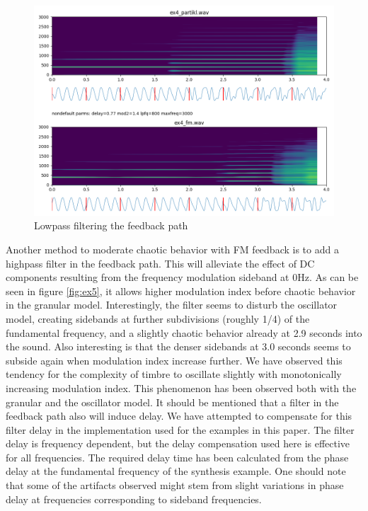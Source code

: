 \documentclass[runningheads,a4paper]{llncs}
\begin{document}
\begin{figure}
	\centering
	\includegraphics[width=.95\textwidth]{ex4_compare.png}
	\caption{Lowpass filtering the feedback path}
	\label{fig:ex4}
\end{figure}

Another method to moderate chaotic behavior with FM feedback is to add a highpass filter in the feedback path. This will alleviate the effect of DC components resulting from the frequency modulation sideband at 0Hz.  As can be seen in figure \ref{fig:ex5},  it allows higher modulation index before chaotic behavior in the granular model. Interestingly, the filter seems to disturb the oscillator model, creating sidebands at further subdivisions (roughly 1/4) of the fundamental frequency, and a slightly chaotic behavior already at 2.9 seconds into the sound. Also interesting is that the denser sidebands at 3.0 seconds seems to subside again when modulation index increase further. We have observed this tendency for the complexity of timbre to oscillate slightly with monotonically increasing modulation index. This phenomenon has been observed both with the granular and the oscillator model. It should be mentioned that a filter in the feedback path also will induce delay. We have attempted to compensate for this filter delay in the implementation used for the examples in this paper. The filter delay is frequency dependent, but the delay compensation used here is effective for all frequencies. The required delay time has been calculated from the phase delay at the fundamental frequency of the synthesis example. One should note that some of the artifacts observed might stem from slight variations in phase delay at frequencies corresponding to sideband frequencies.
\end{document}
